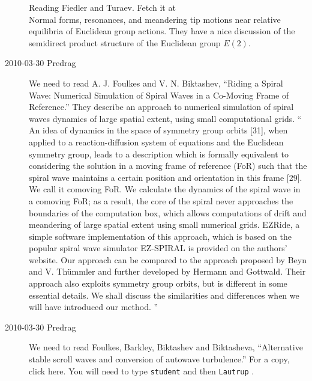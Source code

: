 \begin{description}
Reading Fiedler and Turaev.
Fetch it at
\\
{Normal forms, resonances, and meandering tip motions}
     near relative equilibria of {Euclidean} group actions.
They have a nice discussion of the semidirect product structure of the
Euclidean group $E(2)$.


\item[2010-03-30 Predrag]
We need to read
A. J. Foulkes and V. N. Biktashev,
``Riding a Spiral Wave: Numerical Simulation of Spiral Waves
in a Co-Moving Frame of Reference.''
They describe an approach to numerical simulation of spiral
waves dynamics of large spatial extent, using small
computational grids.
``
An idea of dynamics in the space of symmetry group
orbits [31], when applied to a reaction-diffusion system
of equations and the Euclidean symmetry group, leads to
a description which is formally equivalent to considering
the solution in a moving frame of reference (FoR) such
that the spiral wave maintains a certain position and orientation
in this frame [29]. We call it comoving FoR.
We calculate
the dynamics of the spiral wave in a comoving FoR;
as a result, the core of the spiral never approaches the
boundaries of the computation box, which allows computations
of drift and meandering of large spatial extent using
small numerical grids. EZRide, a simple software implementation
of this approach, which is based on the popular spiral
wave simulator EZ-SPIRAL is provided on the authors' website.
Our approach can be compared to the approach proposed
by Beyn and V. Th\"ummler and further developed
by Hermann and Gottwald. Their approach also exploits
symmetry group orbits, but is different in some
essential details. We shall discuss the similarities and
differences when we will have introduced our method.
''

\item[2010-03-30 Predrag]
We need to read
Foulkes, Barkley, Biktashev and Biktasheva,
``Alternative stable scroll waves and conversion of autowave turbulence.''
For a copy, 
{click here}. You will need to type \texttt{student} and then \texttt{Lautrup} .



\end{description}
